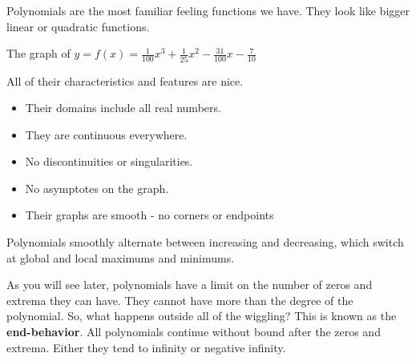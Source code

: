 \documentclass{ximera}
\begin{document}
Polynomials are the most familiar feeling functions we have. They look like bigger linear or quadratic functions.

The graph of $y = f(x) = \frac{1}{100} x^3 + \frac{1}{25} x^2 - \frac{31}{100} x - \frac{7}{10}$

\begin{image}
\end{image}



All of their characteristics and features are nice.

\begin{itemize}
\item Their domains include all real numbers. 
\item They are continuous everywhere.
\item No discontinuities or singularities.
\item No asymptotes on the graph.
\item Their graphs are smooth - no corners or endpoints
\end{itemize}


Polynomials smoothly alternate between increasing and decreasing, which switch at global and local maximums and minimums.

As you will see later, polynomials have a limit on the number of zeros and extrema they can have.  They cannot have more than the degree of the polynomial. So, what happens outside all of the wiggling?  This is known as the \textbf{end-behavior}.  All polynomials continue without bound after the zeros and extrema.  Either they tend to infinity or negative infinity.
\end{document}
